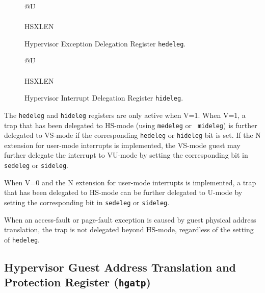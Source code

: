 \begin{figure}[h!]
{\footnotesize
\begin{center}
\begin{tabular}{@{}U}
 \\
\hline
{} \\
\hline
HSXLEN \\
\end{tabular}
\end{center}
}
\vspace{-0.1in}
\caption{Hypervisor Exception Delegation Register {\tt hedeleg}.}
\label{hedelegreg}
\end{figure}

\begin{figure}[h!]
{\footnotesize
\begin{center}
\begin{tabular}{@{}U}
 \\
\hline
{} \\
\hline
HSXLEN \\
\end{tabular}
\end{center}
}
\vspace{-0.1in}
\caption{Hypervisor Interrupt Delegation Register {\tt hideleg}.}
\label{hidelegreg}
\end{figure}

The {\tt hedeleg} and {\tt hideleg} registers are only active when V=1.  When
V=1, a trap that has been delegated to HS-mode (using {\tt medeleg} or {\tt
mideleg}) is further delegated to VS-mode if the corresponding {\tt hedeleg} or
{\tt hideleg} bit is set.  If the N extension for user-mode interrupts
is implemented, the VS-mode guest may further delegate the interrupt
to VU-mode by setting the corresponding bit in {\tt sedeleg} or {\tt sideleg}.

When V=0 and the N extension for user-mode interrupts is implemented, a trap
that has been delegated to HS-mode can be further delegated to U-mode by
setting the corresponding bit in {\tt sedeleg} or {\tt sideleg}.

When an access-fault or page-fault exception is caused by guest physical
address translation, the trap is not delegated beyond HS-mode, regardless of
the setting of {\tt hedeleg}.

\subsection{Hypervisor Guest Address Translation and Protection Register ({\tt hgatp})}
\label{sec:hgatp}

